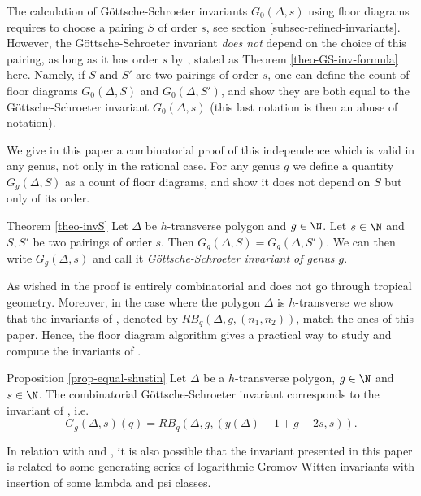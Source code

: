 The calculation of Göttsche-Schroeter invariants $G_0(\Delta,s)$ using floor diagrams requires to choose a pairing $S$ of order $s$, see section \ref{subsec-refined-invariants}. However, the Göttsche-Schroeter invariant \emph{does not} depend on the choice of this pairing, as long as it has order $s$ by \cite[Theorem 2.13]{brugalle_polynomiality_2022}, stated as Theorem \ref{theo-GS-inv-formula} here. Namely, if $S$ and $S'$ are two pairings of order $s$, one can define the count of floor diagrams $G_0(\Delta,S)$ and $G_0(\Delta,S')$, and show they are both equal to the Göttsche-Schroeter invariant $G_0(\Delta,s)$ (this last notation is then an abuse of notation).

We give in this paper a combinatorial proof of this independence which is valid in any genus, not only in the rational case. For any genus $g$ we define a quantity $G_g(\Delta,S)$ as a count of floor diagrams, and show it does not depend on $S$ but only of its order.

\begin{named}{Theorem \ref{theo-invS}}
Let $\Delta$ be $h$-transverse polygon and $g\in\N$. Let $s \in \N$ and $S,S'$ be two pairings of order $s$. Then $G_g(\Delta,S) = G_g(\Delta,S')$. We can then write $G_g(\Delta,s)$ and call it \emph{Göttsche-Schroeter invariant of genus $g$}.
\end{named}

As wished in \cite[Remark 2.14]{brugalle_polynomiality_2022} the proof is entirely combinatorial and does not go through tropical geometry.  
Moreover, in the case where the polygon $\Delta$ is $h$-transverse we show that the invariants of \cite{shustin-2024-refined}, denoted by $RB_q(\Delta,g,(n_1,n_2))$, match the ones of this paper. Hence, the floor diagram algorithm gives a practical way to study and compute the invariants of \cite{shustin-2024-refined}.


\begin{named}{Proposition \ref{prop-equal-shustin}}
Let $\Delta$ be a $h$-transverse polygon, $g\in\N$ and $s\in\N$. The combinatorial Göttsche-Schroeter invariant corresponds to the invariant of \cite{shustin-2024-refined}, i.e. 
\[ G_g(\Delta,s)(q) = RB_q(\Delta,g,(y(\Delta)-1+g-2s,s)) . \]
\end{named}

In relation with \cite{bousseau_refined_2021} and \cite{kennedyhunt-2024-tropical}, it is also possible that the invariant presented in this paper is related to some generating series of logarithmic Gromov-Witten invariants with insertion of some lambda and psi classes.

